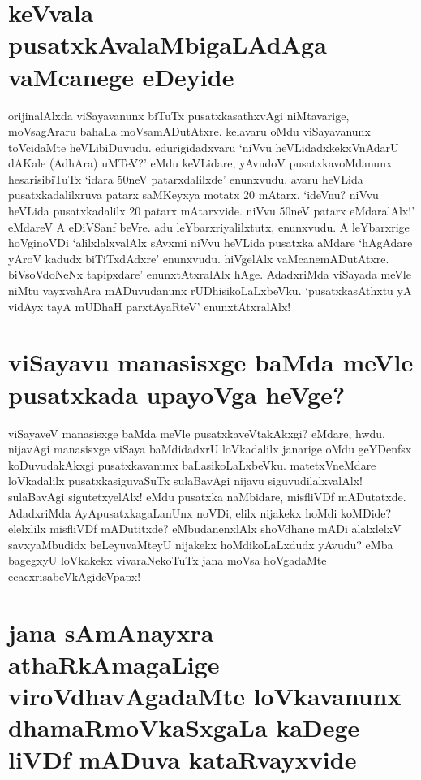 \section*{keVvala pusatxkAvalaMbigaLAdAga vaMcanege eDeyide}

orijinalAlxda viSayavanunx biTuTx pusatxkasathxvAgi niMtavarige, moVsagAraru bahaLa moVsamADutAtxre. kelavaru oMdu viSayavanunx toVcidaMte heVLibiDuvudu. edurigidadxvaru `niVvu heVLidadxkekxVnAdarU dAKale (AdhAra) uMTeV?' eMdu keVLidare, yAvudoV pusatxkavoMdanunx hesarisibiTuTx `idara 50neV patarxdalilxde' enunxvudu. avaru heVLida pusatxkadalilxruva patarx saMKeyxya motatx 20 mAtarx. `ideVnu? niVvu heVLida pusatxkadalilx 20 patarx mAtarxvide. niVvu 50neV patarx eMdaralAlx!' eMdareV A eDiVSanf beVre. adu leYbarxriyalilxtutx, enunxvudu. A leYbarxrige hoVginoVDi `alilxlalxvalAlx sAvxmi niVvu heVLida pusatxka aMdare `hAgAdare yAroV kadudx biTiTxdAdxre' enunxvudu. hiVgelAlx vaMcanemADutAtxre. biVsoVdoNeNx tapipxdare' enunxtAtxralAlx hAge. AdadxriMda viSayada meVle niMtu vayxvahAra mADuvudanunx rUDhisikoLaLxbeVku. `pusatxkasAthxtu yA vidAyx\label{114} tayA mUDhaH parxtAyaRteV' enunxtAtxralAlx!

\section*{viSayavu manasisxge baMda meVle pusatxkada upayoVga heVge?}

viSayaveV manasisxge baMda meVle pusatxkaveVtakAkxgi? eMdare, hwdu. nijavAgi manasisxge viSaya baMdidadxrU loVkadalilx janarige oMdu geYDenfsx  koDuvudakAkxgi pusatxkavanunx baLasikoLaLxbeVku. matetxVneMdare loVkadalilx pusatxkasiguvaSuTx sulaBavAgi nijavu siguvudilalxvalAlx! sulaBavAgi sigutetxyelAlx! eMdu pusatxka naMbidare, misfliVDf mADutatxde. AdadxriMda AyApusatxkagaLanUnx noVDi, elilx nijakekx hoMdi koMDide? elelxlilx misfliVDf mADutitxde? eMbudanenxlAlx shoVdhane mADi alalxlelxV savxyaMbudidx beLeyuvaMteyU nijakekx hoMdikoLaLxdudx yAvudu? eMba bagegxyU loVkakekx vivaraNekoTuTx jana moVsa hoVgadaMte ecacxrisabeVkAgideVpapx!

\section*{jana sAmAnayxra athaRkAmagaLige viroVdhavAgadaMte loVkavanunx dhamaRmoVkaSxgaLa kaDege liVDf mADuva kataRvayxvide}


